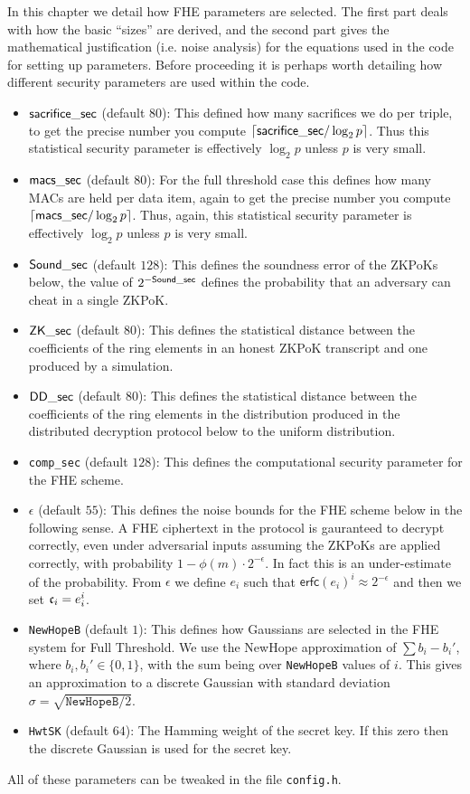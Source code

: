\label{sec:fhe}
In this chapter we detail how FHE parameters are selected.
The first part deals with how the basic ``sizes'' are derived,
and the second part gives the mathematical justification (i.e.
noise analysis) for the equations used in the code for setting
up parameters.
Before proceeding it is perhaps worth detailing how
different security parameters are used within the code.

\begin{itemize}
\item $\mathsf{sacrifice\_sec}$ (default $80$): 
This defined how many sacrifices we do per triple, 
to get the precise number you compute ${\lceil \mathsf{sacrifice\_sec}/\log_2 p \rceil}$.
Thus this statistical security parameter is effectively
$\log_2 p$ unless $p$ is very small.
\item $\mathsf{macs\_sec}$ (default $80$):
For the full threshold case this defines how many MACs are held
per data item, again to get the precise number you compute 
${\lceil \mathsf{macs\_sec}/\log_2 p \rceil}$.
Thus, again, this statistical security parameter is effectively
$\log_2 p$ unless $p$ is very small.
\item $\mathsf{Sound\_sec}$ (default $128$):
This defines the soundness error of the ZKPoKs below,
the value of $2^{-\mathsf{Sound\_sec}}$ defines the probability
that an adversary can cheat in a single ZKPoK.
\item $\mathsf{ZK\_sec}$ (default $80$): 
This defines the statistical distance between the 
coefficients of the ring elements in an honest ZKPoK
transcript and one produced by a simulation.
\item $\mathsf{DD\_sec}$ (default $80$):
This defines the statistical distance between the 
coefficients of the ring elements in the distribution produced
in the distributed decryption protocol below to the uniform
distribution.
\item \verb+comp_sec+ (default $128$):
This defines the computational security parameter for the
FHE scheme. 
\item $\epsilon$ (default $55$):
This defines the noise bounds for the FHE scheme below in
the following sense.
A FHE ciphertext in the protocol is gauranteed to decrypt
correctly, even under adversarial inputs assuming the
ZKPoKs are applied correctly, with probability $1-\phi(m) \cdot 2^{-\epsilon}$.
In fact this is an under-estimate of the probability.
From $\epsilon$ we define $e_i$ such that 
$\mathsf{erfc}(e_i)^i \approx 2^{-\epsilon}$ and then we set $\mathfrak{c}_i = e_i^i$.
\item \verb+NewHopeB+ (default $1$):
This defines how Gaussians are selected in the FHE system for
Full Threshold. We use the NewHope approximation of
$\sum b_i - b_i'$, where $b_i, b_i' \in \{0,1\}$,
with the sum being over \verb+NewHopeB+ values of $i$.
This gives an approximation to a discrete Gaussian with
standard deviation $\sigma = \sqrt{\texttt{NewHopeB}/2}$.
\item \verb+HwtSK+ (default $64$):
The Hamming weight of the secret key. If this zero
then the discrete Gaussian is used for the secret key.
\end{itemize}
All of these parameters can be tweaked in the file
\verb+config.h+.


